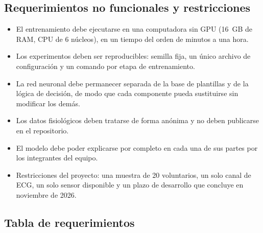 \subsection{Requerimientos no funcionales y restricciones}

\begin{itemize}
  \item El entrenamiento debe ejecutarse en una computadora sin GPU (16~GB de RAM, CPU de 6 núcleos), en un tiempo del orden de minutos a una hora.
  \item Los experimentos deben ser reproducibles: semilla fija, un único archivo de configuración y un comando por etapa de entrenamiento.
  \item La red neuronal debe permanecer separada de la base de plantillas y de la lógica de decisión, de modo que cada componente pueda sustituirse sin modificar los demás.
  \item Los datos fisiológicos deben tratarse de forma anónima y no deben publicarse en el repositorio.
  \item El modelo debe poder explicarse por completo en cada una de sus partes por los integrantes del equipo.
  \item Restricciones del proyecto: una muestra de 20 voluntarios, un solo canal de ECG, un solo sensor disponible y un plazo de desarrollo que concluye en noviembre de 2026.
\end{itemize}

\subsection{Tabla de requerimientos}

